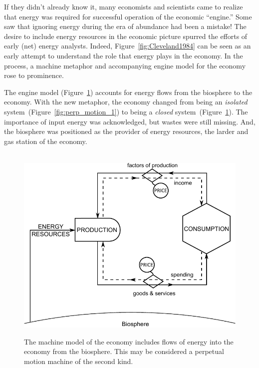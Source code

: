If they didn't already know it, many economists and scientists
came to realize that energy was required
for successful operation of the economic ``engine.''
Some saw that ignoring energy during the era of abundance
had been a mistake!
The desire to include energy resources
in the economic picture
spurred the efforts of early (net) energy 
analysts.\cite{Gilliland1975, Chapman1976}
Indeed, Figure~\ref{fig:Cleveland1984} can be seen as an early attempt
to understand the role that energy plays in the economy.
In the process, a machine metaphor and 
accompanying engine model for the economy 
rose to prominence.

The engine model (Figure~\ref{fig:perp_motion_2}) 
accounts for energy flows from the biosphere 
to the economy.
With the new metaphor, 
the economy changed 
from being an \emph{isolated} system~(Figure~\ref{fig:perp_motion_1}) 
to being a \emph{closed} system~(Figure~\ref{fig:perp_motion_2}). 
The importance of input energy was acknowledged, 
but wastes were still missing.
And, the biosphere was positioned as the provider of energy resources, 
the larder and gas station of the economy.\cite{Norgaard2010}

\begin{figure}[H]
\centering\
\includegraphics[width=\linewidth]{Part_0/Chapter_Acct_For_WoN/images/Perpetual_motion_2.pdf}
\caption[The machine model]{The machine model of the economy includes
flows of energy into the economy from the biosphere.
This may be considered a perpetual motion machine 
of the second kind.}
\label{fig:perp_motion_2}
\end{figure}

